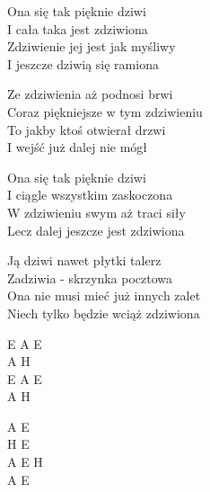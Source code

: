 \begin{text}
    Ona się tak pięknie dziwi\\
    I cała taka jest zdziwiona\\
    Zdziwienie jej jest jak myśliwy\\
    I jeszcze dziwią się ramiona

    Ze zdziwienia aż podnosi brwi\\
    Coraz piękniejsze w tym zdziwieniu\\
    To jakby ktoś otwierał drzwi\\
    I wejść już dalej nie mógł

    Ona się tak pięknie dziwi\\
    I ciągle wszystkim zaskoczona\\
    W zdziwieniu swym aż traci siły\\
    Lecz dalej jeszcze jest zdziwiona

    Ją dziwi nawet płytki talerz\\
    Zadziwia - skrzynka pocztowa\\
    Ona nie musi mieć już innych zalet\\
    Niech tylko będzie wciąż zdziwiona
\end{text}
\begin{chord}
    E A E\\
    A H\\
    E A E\\
    A H

    A E\\
    H E\\
    A E H\\
    A E
\end{chord}